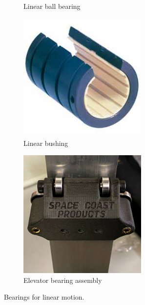 \begin{figure}[H]
\begin{subfigure}[b]{.32\linewidth}
			\caption{Linear ball bearing}
		\end{subfigure}
		\begin{subfigure}[b]{.32\linewidth}
			\includegraphics[width=0.7\textwidth]{imgs/linearbushing.jpeg}
			\caption{Linear bushing}
		\end{subfigure}
		\begin{subfigure}[b]{.32\linewidth}
			\includegraphics[width=0.7\textwidth]{imgs/elevatorbearingassy.jpeg}
			\caption{Elevator bearing assembly}
		\end{subfigure}
		
		\caption{Bearings for linear motion.}
	\end{figure}
	

